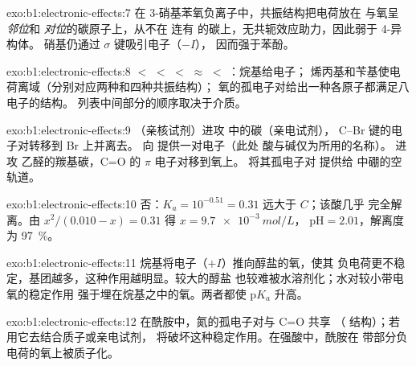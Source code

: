\begin{solution}{exo:b1:electronic-effects:7}
在 3-硝基苯氧负离子中，共振结构把电荷放在
与氧呈 \textit{邻位}和 \textit{对位}的碳原子上，从不在
连有  的碳上，无共轭效应助力，因此弱于 4-异构体。
硝基仍通过 $\sigma$ 键吸引电子（$-I$），
因而强于苯酚。
\end{solution}

\begin{solution}{exo:b1:electronic-effects:8}
 $<$  $<$  $<$ 
$\approx$  $<$ ：烷基给电子；
烯丙基和苄基使电荷离域（分别对应两种和四种共振结构）；
氧的孤电子对给出一种各原子都满足八电子的结构。
列表中间部分的顺序取决于介质。
\end{solution}

\begin{solution}{exo:b1:electronic-effects:9}
（亲核试剂）进攻  中的碳（亲电试剂），
C--Br 键的电子对转移到 Br 上并离去。 向  提供一对电子（此处
酸与碱仅为所用的名称）。 进攻
乙醛的羰基碳，C=O 的 $\pi$ 电子对移到氧上。 将其孤电子对
提供给  中硼的空轨道。
\end{solution}

\begin{solution}{exo:b1:electronic-effects:10}
否：$K_a = 10^{-0.51} = 0.31$ 远大于 $C$；该酸几乎
完全解离。由 $x^2/(0.010 - x) = 0.31$ 得 $x = \qty{9.7e-3}{mol/L}$，
$\mathrm{pH} = 2.01$，解离度为 \qty{97}{\percent}。
\end{solution}

\begin{solution}{exo:b1:electronic-effects:11}
烷基将电子（$+I$）推向醇盐的氧，使其
负电荷更不稳定，基团越多，这种作用越明显。较大的醇盐
也较难被水溶剂化；水对较小带电氧的稳定作用
强于埋在烷基之中的氧。两者都使
$\mathrm{p}K_a$ 升高。
\end{solution}

\begin{solution}{exo:b1:electronic-effects:12}
在酰胺中，氮的孤电子对与 C=O 共享
（ 结构）；若用它去结合质子或亲电试剂，
将破坏这种稳定作用。在强酸中，酰胺在
带部分负电荷的氧上被质子化。
\end{solution}

